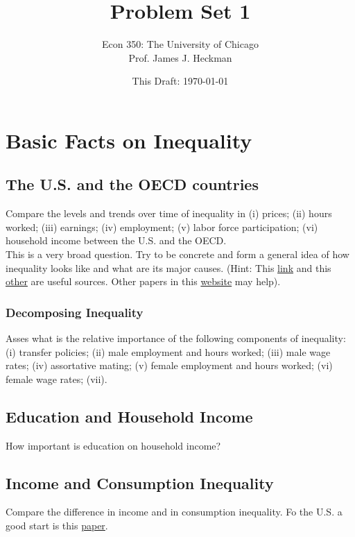



\title{\textbf{Problem Set 1}}
\author{Econ 350: The University of Chicago \\ Prof. James J. Heckman}
\date{This Draft: \today}
\maketitle

\section{Basic Facts on Inequality}
\subsection{The U.S. and the OECD countries}
\noindent Compare the levels and trends over time of inequality in (i) prices; (ii) hours worked; (iii) earnings; (iv) employment; (v) labor force participation; (vi) household income between the U.S. and the OECD.\\ 
\indent This is a very broad question. Try to be concrete and form a general idea of how inequality looks like and what are its major causes. (Hint: This \href{http://jenni.uchicago.edu/econ350/slides/wage-ed-facts_ECON-350_2013-01-14a_jsw.pdf}{link} and this \href{www.oecd-ilibrary.org.proxy.uchicago.edu/social-issues-migration-health/the-causes-of-growing-inequalities-in-oecd-countries_9789264119536-en}{other} are useful sources. Other papers in this \href{https://heckman.uchicago.edu/page/economics-350}{website} may help). 
\subsubsection{Decomposing Inequality}
Asses what is the relative importance of the following components of inequality: (i) transfer policies; (ii) male employment and hours worked; (iii) male wage rates; (iv) assortative mating; (v) female employment and hours worked; (vi) female wage rates; (vii).\\
\subsection{Education and Household Income}
\noindent How important is education on household income?
\subsection{Income and Consumption Inequality}
Compare the difference in income and in consumption inequality. Fo the U.S. a good start is this \href{http://jenni.uchicago.edu/econ350/papers/Meyer_Sullivan_2012_AEIMonograph4-3.pdf}{paper}.
